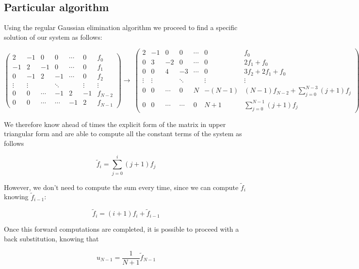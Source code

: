 \documentclass {article}
\begin{document}
\subsection{Particular algorithm}

Using the regular Gaussian elimination algorithm we proceed to find a specific solution of our system as follows:

\begin{equation}
\left(
\begin{array}{cccccc|c}
   2 & -1 &  0 & 0 & \cdots & 0 & f_0 \\
  -1 &  2 & -1 & 0 & \cdots & 0 & f_1 \\
   0 &-1 &  2 & -1 & \cdots & 0 & f_2\\
  \vdots  & \vdots  & & \ddots & & \vdots & \vdots  \\
   0 &  0 & \cdots  & -1 & 2 & -1 & f_{N-2} \\
   0 &  0 & \cdots & \cdots  & -1 & 2 & f_{N-1} 
\end{array}	
\right)
\longrightarrow\
\left(
\begin{array}{cccccc|c}
   2 & -1 &  0 & 0 & \cdots & 0 & f_0 \\
   0 &  3 & -2 & 0 & \cdots & 0 & 2 f_1+f_0 \\
   0 & 0 &  4 & -3 & \cdots & 0 & 3 f_2+2 f_1+f_0\\
  \vdots  & \vdots  & & \ddots & & \vdots & \vdots  \\
   0 &  0 & \cdots  & 0 & N & -(N-1) &  (N-1) f_{N-2} + \sum_{j=0}^{N-3} (j+1)f_{j}  \\
   0 &  0 & \cdots & \cdots  & 0 & N+1 &  \sum_{j=0}^{N-1} (j+1)f_{j} 
\end{array}	
\right)
\end{equation}

We therefore know ahead of times the explicit form of the matrix in upper triangular form and are able to compute all the constant terms of the system as follows

$$\tilde{f}_i= \sum_{j=0}^{i}(j+1) f_j$$

However, we don't need to compute the sum every time, since we can compute $\tilde{f}_i$ knowing $\tilde{f}_{i-1}$:

$$\tilde{f}_i=(i+1)f_i+\tilde{f}_{i-1}$$

Once this forward computations are completed, it is possible to proceed with a back substitution, knowing that

$$u_{N-1}=\frac{1}{N+1} \tilde{f}_{N-1}$$
\end{document}
